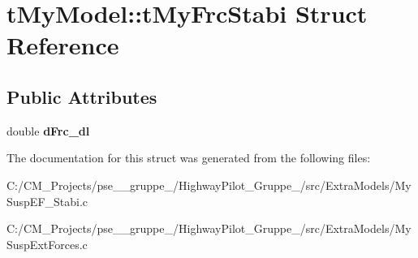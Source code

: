 \hypertarget{structt_my_model_1_1t_my_frc_stabi}{}\section{t\+My\+Model\+::t\+My\+Frc\+Stabi Struct Reference}
\label{structt_my_model_1_1t_my_frc_stabi}
\subsection*{Public Attributes}
\begin{DoxyCompactItemize}
\item 
\mbox{\label{structt_my_model_1_1t_my_frc_stabi_a4fc9eb4b223b1fb28bbb36f8e435689d}} 
double {\bfseries d\+Frc\+\_\+dl}
\end{DoxyCompactItemize}


The documentation for this struct was generated from the following files\+:\begin{DoxyCompactItemize}
\item 
C\+:/\+C\+M\+\_\+\+Projects/pse\+\_\+\_\+gruppe\+\_/\+Highway\+Pilot\+\_\+\+Gruppe\+\_/src/\+Extra\+Models/My\+Susp\+E\+F\+\_\+\+Stabi.\+c\item 
C\+:/\+C\+M\+\_\+\+Projects/pse\+\_\+\_\+gruppe\+\_/\+Highway\+Pilot\+\_\+\+Gruppe\+\_/src/\+Extra\+Models/My\+Susp\+Ext\+Forces.\+c\end{DoxyCompactItemize}

